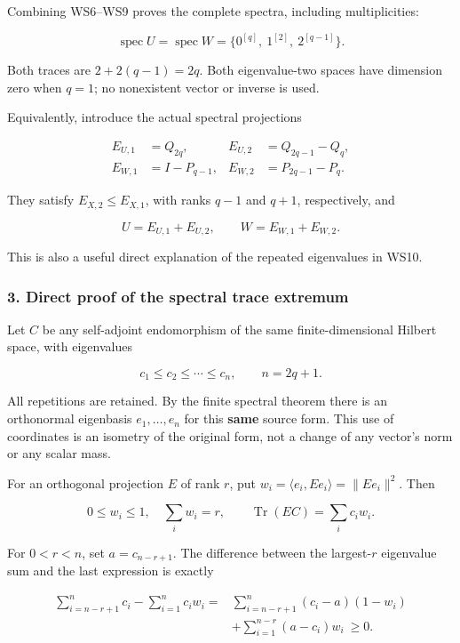\documentclass{article}
\begin{document}
Combining WS6--WS9 proves the complete spectra, including multiplicities:

\[
\boxed{\quad
\operatorname{spec}U=\operatorname{spec}W
=\{0^{[q]},\ 1^{[2]},\ 2^{[q-1]}\}.
\quad}
\tag{WS10}
\]

Both traces are \(2+2(q-1)=2q\). Both eigenvalue-two spaces have dimension zero when \(q=1\); no nonexistent vector or inverse is used.

Equivalently, introduce the actual spectral projections

\[
\begin{aligned}
E_{U,1}&=Q_{2q},&E_{U,2}&=Q_{2q-1}-Q_q,\\
E_{W,1}&=I-P_{q-1},&E_{W,2}&=P_{2q-1}-P_q.
\end{aligned}
\tag{WS11}
\]

They satisfy \(E_{X,2}\le E_{X,1}\), with ranks \(q-1\) and \(q+1\), respectively, and

\[
U=E_{U,1}+E_{U,2},\qquad
W=E_{W,1}+E_{W,2}.
\tag{WS12}
\]

This is also a useful direct explanation of the repeated eigenvalues in WS10.

\subsubsection{3. Direct proof of the spectral trace extremum}\label{endpoint-window_review--direct-proof-of-the-spectral-trace-extremum}

Let \(C\) be any self-adjoint endomorphism of the same finite-dimensional Hilbert space, with eigenvalues

\[
c_1\le c_2\le\cdots\le c_n,
\qquad n=2q+1.
\tag{WS13}
\]

All repetitions are retained. By the finite spectral theorem there is an orthonormal eigenbasis \(e_1,\ldots,e_n\) for this \textbf{same} source form. This use of coordinates is an isometry of the original form, not a change of any vector's norm or any scalar mass.

For an orthogonal projection \(E\) of rank \(r\), put \(w_i=\langle e_i,Ee_i\rangle=\|Ee_i\|^2\). Then

\[
0\le w_i\le1,\quad\sum_iw_i=r,
\qquad\operatorname{Tr}(EC)=\sum_i c_iw_i.
\tag{WS14}
\]

For \(0<r<n\), set \(a=c_{n-r+1}\). The difference between the largest-\(r\) eigenvalue sum and the last expression is exactly

\[
\begin{aligned}
\sum_{i=n-r+1}^n c_i-\sum_{i=1}^n c_iw_i
={}&\sum_{i=n-r+1}^n(c_i-a)(1-w_i)\\
&+\sum_{i=1}^{n-r}(a-c_i)w_i\ \ge0.
\end{aligned}
\tag{WS15}
\]
\end{document}
